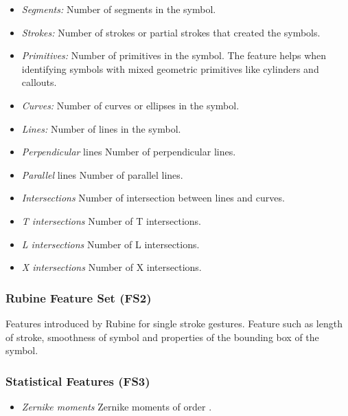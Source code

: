 \documentclass{article}
\begin{document}
 \begin{itemize}
	 \item \emph{Segments:} Number of segments in the symbol.
	 \item \emph{Strokes:} Number of strokes or partial strokes that created the symbols.  
		\item  \emph{Primitives:} Number of primitives in the symbol. The feature helps when identifying             symbols with mixed geometric primitives like cylinders and callouts.  
		\item \emph{Curves:} Number of curves or ellipses in the symbol. 
		\item \emph{Lines:} Number of lines in the symbol. 
		\item \emph{Perpendicular} lines Number of perpendicular lines. 
		\item \emph{Parallel} lines Number of parallel lines. 
		\item \emph{Intersections} Number of intersection between lines and curves. 
		\item \emph{T intersections} Number of T intersections. 
		\item \emph{L intersections} Number of L intersections. 
		\item \emph{X intersections} Number of X intersections.
	
\end{itemize}
\subsubsection{Rubine Feature Set (FS2)}
  Features introduced by Rubine\cite{gestureexample12} for single stroke gestures. Feature such as length of stroke, smoothness of symbol and properties of the bounding box of the symbol. 
  
\subsubsection{Statistical Features (FS3)}  
\begin{itemize}
	\item \emph{Zernike moments } Zernike moments of order \cite{HeloiseBeautification}. 
\end{itemize}
\end{document}
